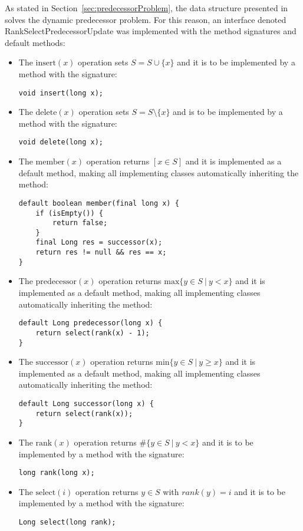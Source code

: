 As stated in Section~\ref{sec:predecessorProblem}, the data structure presented in \cite{patrascu2014dynamic} solves the dynamic predecessor problem. For this reason, an interface denoted {\ttfamily RankSelectPredecessorUpdate} was implemented with the method signatures and default methods:
\begin{itemize}
    \item
    The $\text{insert}(x)$ operation sets $S=S \cup \{x\}$ and it is to be implemented by a method with the signature:
    \begin{lstlisting}
void insert(long x);
    \end{lstlisting}
    
    \item
    The $\text{delete}(x)$ operation sets $S=S \setminus \{x\}$ and is to be implemented by a method with the signature:
    \begin{lstlisting}
void delete(long x);
    \end{lstlisting}
    
    \item
    The $\text{member}(x)$ operation returns $[x \in S]$ and it is implemented as a default method, making all implementing classes automatically inheriting the method:
    \begin{lstlisting}
default boolean member(final long x) {
    if (isEmpty()) {
        return false;
    }
    final Long res = successor(x);
    return res != null && res == x;
}
    \end{lstlisting}

    \item
    The $\text{predecessor}(x)$ operation returns $\text{max}\{y\in S\ |\ y < x\}$ and it is implemented as a default method, making all implementing classes automatically inheriting the method:
    \begin{lstlisting}
default Long predecessor(long x) {
    return select(rank(x) - 1);
}
    \end{lstlisting}

    \item
    The $\text{successor}(x)$ operation returns $\text{min}\{y\in S\ |\ y \geq x\}$ and it is implemented as a default method, making all implementing classes automatically inheriting the method:
    \begin{lstlisting}
default Long successor(long x) {
    return select(rank(x));
}
    \end{lstlisting}

    \item
    The $\text{rank}(x)$ operation returns $\#\{ y \in S\ |\ y < x\}$ and it is to be implemented by a method with the signature:
    \begin{lstlisting}
long rank(long x);
    \end{lstlisting}

    \item
    The $\text{select}(i)$ operation returns $y \in S$ with $rank(y) = i$ and it is to be implemented by a method with the signature:
    \begin{lstlisting}
Long select(long rank);
    \end{lstlisting}
\end{itemize}
